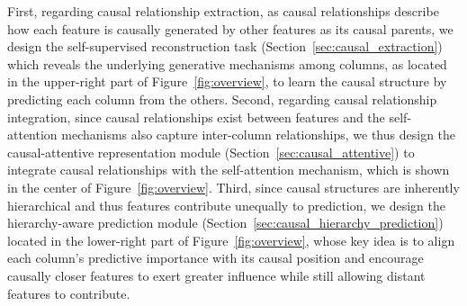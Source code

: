 \documentclass[sigconf, nonacm]{acmart}
\newcommand{\icde}[1]{{\color{black}#1}}
\newcommand{\syadd}[1]{{\color{black}#1}}
\newcommand{\syfix}[1]{{\color{black}#1}}
\newcommand{\syne}[1]{{\color{black}#1}}
\newcommand*{\ourmodel}{CAIM}
\begin{document}

First, 
regarding causal relationship extraction, 
as causal relationships 
\icde{
describe how each feature is causally generated \syne{by} other features as its causal parents,
} 
we design the self-supervised reconstruction task (Section~\ref{sec:causal_extraction})
\syadd{
which reveals the underlying generative mechanisms among columns, as located in the upper-right part of Figure~\ref{fig:overview},
} to learn \syfix{the causal structure} by predicting each column from the others. 
Second, regarding causal relationship integration, 
\syfix{
since causal relationships exist between features
} 
and the self-attention mechanisms also capture inter-column relationships, we thus design the causal-attentive representation module (Section~\ref{sec:causal_attentive}) to integrate causal relationships with the self-attention mechanism, which is shown in the center of Figure~\ref{fig:overview}. 
Third, since causal structures are inherently hierarchical and thus features contribute unequally to prediction, we design the hierarchy-aware prediction module (Section~\ref{sec:causal_hierarchy_prediction}) \syadd{located in the lower-right part of Figure~\ref{fig:overview}, whose key idea is \syne{to} 
align each column's predictive importance with its causal position and encourage causally closer features to exert greater influence while still allowing distant features to contribute.}
\end{document}
